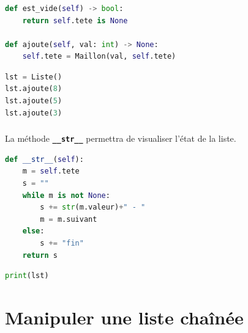 \documentclass[svgnames,11pt]{beamer}
\begin{document}
\begin{frame}[fragile]
    \frametitle{}

    \begin{center}
        \begin{lstlisting}[language=Python , basicstyle=\ttfamily\small, xleftmargin=2em, xrightmargin=2em]
def est_vide(self) -> bool:
    return self.tete is None

def ajoute(self, val: int) -> None:
    self.tete = Maillon(val, self.tete)
\end{lstlisting}
    \end{center}
    \begin{center}
        \begin{lstlisting}[language=Python , basicstyle=\ttfamily\small, xleftmargin=2em, xrightmargin=2em]
lst = Liste()
lst.ajoute(8)
lst.ajoute(5)
lst.ajoute(3)
\end{lstlisting}
        \label{CODE}
    \end{center}
\end{frame}
\begin{frame}[fragile]
    \frametitle{}

    La méthode \textbf{\texttt{\_\_str\_\_}} permettra de visualiser l'état de la liste.
\begin{center}
\begin{lstlisting}[language=Python , basicstyle=\ttfamily\small, xleftmargin=2em, xrightmargin=2em]
def __str__(self):
    m = self.tete
    s = ""
    while m is not None:
        s += str(m.valeur)+" - "
        m = m.suivant
    else:
        s += "fin"
    return s
\end{lstlisting}
\end{center}
\begin{center}
\begin{lstlisting}[language=Python , basicstyle=\ttfamily\small, xleftmargin=2em, xrightmargin=2em]
print(lst)
\end{lstlisting}
\label{CODE}
\end{center}
\end{frame}
\section{Manipuler une liste chaînée}
\end{document}
